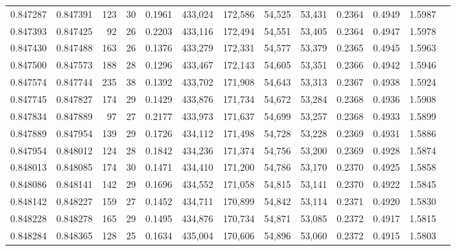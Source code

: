 \begin{tabular}{rrrrrrrrrrrrr}
0.847287 & 0.847391 &   123 &  30 &                                     0.1961 & 433,024 & 172,586 &  54,525 &  53,431 & 0.2364 & 0.4949 & 1.5987 \\
0.847393 & 0.847425 &    92 &  26 &                                     0.2203 & 433,116 & 172,494 &  54,551 &  53,405 & 0.2364 & 0.4947 & 1.5978 \\
0.847430 & 0.847488 &   163 &  26 &                                     0.1376 & 433,279 & 172,331 &  54,577 &  53,379 & 0.2365 & 0.4945 & 1.5963 \\
0.847500 & 0.847573 &   188 &  28 &                                     0.1296 & 433,467 & 172,143 &  54,605 &  53,351 & 0.2366 & 0.4942 & 1.5946 \\
0.847574 & 0.847744 &   235 &  38 &                                     0.1392 & 433,702 & 171,908 &  54,643 &  53,313 & 0.2367 & 0.4938 & 1.5924 \\
0.847745 & 0.847827 &   174 &  29 &                                     0.1429 & 433,876 & 171,734 &  54,672 &  53,284 & 0.2368 & 0.4936 & 1.5908 \\
0.847834 & 0.847889 &    97 &  27 &                                     0.2177 & 433,973 & 171,637 &  54,699 &  53,257 & 0.2368 & 0.4933 & 1.5899 \\
0.847889 & 0.847954 &   139 &  29 &                                     0.1726 & 434,112 & 171,498 &  54,728 &  53,228 & 0.2369 & 0.4931 & 1.5886 \\
0.847954 & 0.848012 &   124 &  28 &                                     0.1842 & 434,236 & 171,374 &  54,756 &  53,200 & 0.2369 & 0.4928 & 1.5874 \\
0.848013 & 0.848085 &   174 &  30 &                                     0.1471 & 434,410 & 171,200 &  54,786 &  53,170 & 0.2370 & 0.4925 & 1.5858 \\
0.848086 & 0.848141 &   142 &  29 &                                     0.1696 & 434,552 & 171,058 &  54,815 &  53,141 & 0.2370 & 0.4922 & 1.5845 \\
0.848142 & 0.848227 &   159 &  27 &                                     0.1452 & 434,711 & 170,899 &  54,842 &  53,114 & 0.2371 & 0.4920 & 1.5830 \\
0.848228 & 0.848278 &   165 &  29 &                                     0.1495 & 434,876 & 170,734 &  54,871 &  53,085 & 0.2372 & 0.4917 & 1.5815 \\
0.848284 & 0.848365 &   128 &  25 &                                     0.1634 & 435,004 & 170,606 &  54,896 &  53,060 & 0.2372 & 0.4915 & 1.5803 \\

\end{tabular}
